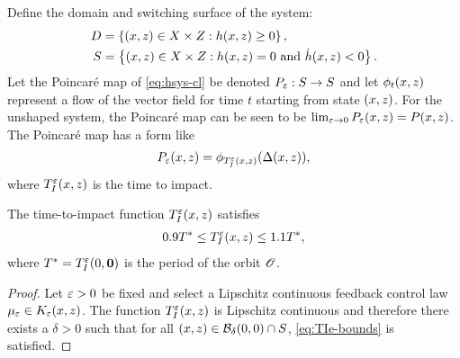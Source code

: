 \documentclass[twocolumn]{article}
\begin{document}
Define the domain and switching surface of the system:
\begin{align}
  D &= \left\{ (x, z) \in X \times Z : h(x, z) \geq 0 \right\},\\
  \nonumber
  S &= \left\{ (x, z) \in X \times Z : h(x, z) = 0 \mbox{ and } {\dot h}(x, z) < 0 \right\}.
\end{align}
Let the Poincar{\'e} map of \eqref{eq:hsys-cl} be denoted $P_{\varepsilon} : S \to S$ and let $\phi_{t}(x, z)$ represent a flow of the vector field for time $t$ starting from state $(x, z)$.
%
For the unshaped system, the Poincar{\'e} map can be seen to be $\lim_{\varepsilon \to 0} P_{\varepsilon}(x, z) = P(x, z)$.
%
The Poincar{\'e} map has a form like
\begin{align}
  P_{\varepsilon}(x, z) = \phi_{T_{I}^{\varepsilon}(x, z)}(\Delta(x, z)),
\end{align}
where $T_{I}^{\varepsilon}(x, z)$ is the time to impact.

\begin{lemma}
  \label{lemma:TIe-bounds}
  The time-to-impact function $T_{I}^{\varepsilon}(x, z)$ satisfies
  \begin{align}
    \label{eq:TIe-bounds}
    0.9 T^{*} \leq T_{I}^{\varepsilon}(x, z) \leq 1.1 T^{*},
  \end{align}
  where $T^{*} = T_{I}^{\varepsilon}(0, {\mathbf 0})$ is the period of the orbit ${\mathscr O}$.
\end{lemma}
\begin{proof}
  Let $\varepsilon > 0$ be fixed and select a Lipschitz continuous feedback control law $\mu_{\varepsilon} \in K_{\varepsilon}(x, z)$. The function $T_{I}^{\varepsilon}(x, z)$ is Lipschitz continuous and therefore there exists a $\delta > 0$ such that for all $(x, z) \in {\mathcal B}_{\delta}(0, 0) \cap S$, \eqref{eq:TIe-bounds} is satisfied.
\end{proof}
\end{document}
